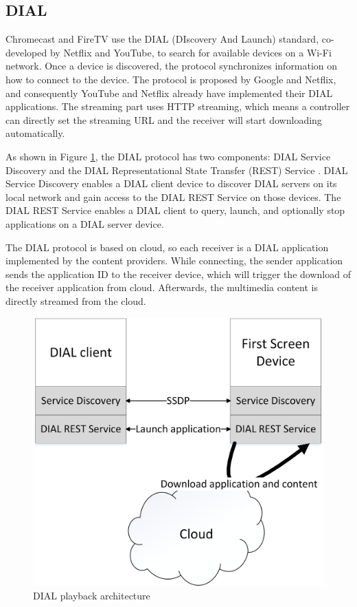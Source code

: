 \subsection{DIAL\label{2_2_4}} 
Chromecast and FireTV use the DIAL \cite{dial} (DIscovery And Launch) standard,
co-developed by Netflix and YouTube, to search for available devices on a Wi-Fi network. 
Once a device is discovered, the protocol synchronizes information on how to 
connect to the device. The protocol is proposed by Google and Netflix, and
consequently YouTube and Netflix already have implemented their DIAL
applications. The streaming part uses HTTP streaming, which means a controller can directly set
the streaming URL and the receiver will start downloading automatically.

As shown in Figure \ref{DIAL_use_scenario}, the DIAL protocol has two
components: DIAL Service Discovery and the DIAL Representational State Transfer
(REST) Service \cite{dial}. DIAL Service Discovery enables a DIAL client device
to discover DIAL servers on its local network and gain access to the DIAL REST
Service on those devices. The DIAL REST Service enables a DIAL client to query,
launch, and optionally stop applications on a DIAL server device. 

The DIAL protocol is based on cloud, so each receiver is a DIAL application
implemented by the content providers. While connecting, the sender application
sends the application ID to the receiver device, which will trigger
the download of the receiver application from cloud. Afterwards, the multimedia
content is directly streamed from the cloud.

\begin{figure}[htb] 
\centering \includegraphics[width=0.7\columnwidth]{charts/DIAL} 
\caption{DIAL playback architecture\label{DIAL_use_scenario}} 
\end{figure}  

